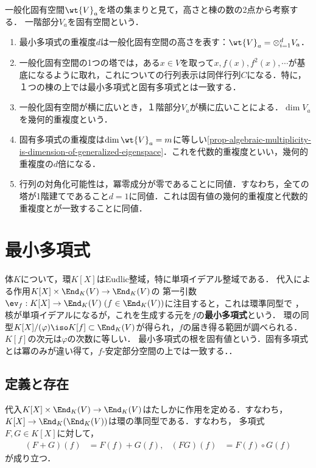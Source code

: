 \documentclass[uplatex, dvipdfmx]{jsreport}
\begin{document}
一般化固有空間$\wt{V}_a$を塔の集まりと見て，高さと棟の数の2点から考察する．
一階部分$V_a$を固有空間という．
\begin{enumerate}
    \item 最小多項式の重複度$d$は一般化固有空間の高さを表す：$\wt{V}_a=\otimes_{i=1}^dV_a$．
    \item 一般化固有空間の1つの塔では，ある$x\in V$を取って$x,f(x),f^2(x),\cdots$が基底になるように取れ，これについての行列表示は同伴行列$C$になる．特に，１つの棟の上では最小多項式と固有多項式とは一致する．
    \item 一般化固有空間が横に広いとき，１階部分$V_a$が横に広いことによる．$\dim V_a$を幾何的重複度という．
    \item 固有多項式の重複度は$\dim\wt{V}_a=m$に等しい\ref{prop-algebraic-multiplicity-is-dimension-of-generalized-eigenspace}．これを代数的重複度といい，幾何的重複度の$d$倍になる．
    \item 行列の対角化可能性は，冪零成分が零であることに同値．すなわち，全ての塔が1階建てであること$d=1$に同値．これは固有値の幾何的重複度と代数的重複度とが一致することに同値．
\end{enumerate}

\section{最小多項式}

\begin{tcolorbox}[colframe=ForestGreen, colback=ForestGreen!10!white,breakable,colbacktitle=ForestGreen!40!white,coltitle=black,fonttitle=\bfseries\sffamily,
title=]
    体$K$について，環$K[X]$はEudlic整域，特に単項イデアル整域である．
    代入による作用$K[X]\times\End_K(V)\to\End_K(V)$の
    第一引数$\ev_f:K[X]\to\End_K(V)\;(f\in\End_K(V))$に注目すると，これは環準同型で
    ，核が単項イデアルになるが，これを生成する元を$f$の\textbf{最小多項式}という．
    環の同型$K[X]/(\varphi)\iso K[f]\subset \End_K(V)$が得られ，$f$の届き得る範囲が調べられる．
    $K[f]$の次元は$\varphi$の次数に等しい．
    最小多項式の根を固有値という．固有多項式とは冪のみが違い得て，$f$-安定部分空間の上では一致する．．
\end{tcolorbox}

\subsection{定義と存在}

\begin{proposition}\label{prop-functoriality-of-substitution}
    代入$K[X]\times\End_K(V)\to\End_K(V)$はたしかに作用を定める．すなわち，
    $K[X]\to\End_K(\End_K(V))$は環の準同型である．すなわち，
    多項式$F,G\in K[X]$に対して，
    \begin{align*}
        (F+G)(f)&=F(f)+G(f),&(FG)(f)&=F(f)\circ G(f)
    \end{align*}
    が成り立つ．
\end{proposition}
\end{document}
